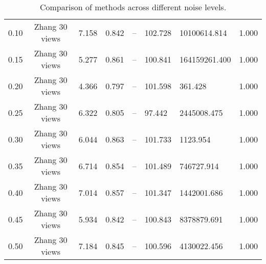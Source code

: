 \begin{table}[H]
\begin{tabular}{l c l l l}
0.10 & Zhang 30 views & 7.158 & 0.842 & -- & 102.728 & 10100614.814 & 1.000 \\
0.15 & Zhang 30 views & 5.277 & 0.861 & -- & 100.841 & 164159261.400 & 1.000 \\
0.20 & Zhang 30 views & 4.366 & 0.797 & -- & 101.598 & 361.428 & 1.000 \\
0.25 & Zhang 30 views & 6.322 & 0.805 & -- & 97.442 & 2445008.475 & 1.000 \\
0.30 & Zhang 30 views & 6.044 & 0.863 & -- & 101.733 & 1123.954 & 1.000 \\
0.35 & Zhang 30 views & 6.714 & 0.854 & -- & 101.489 & 746727.914 & 1.000 \\
0.40 & Zhang 30 views & 7.014 & 0.857 & -- & 101.347 & 1442001.686 & 1.000 \\
0.45 & Zhang 30 views & 5.934 & 0.842 & -- & 100.843 & 8378879.691 & 1.000 \\
0.50 & Zhang 30 views & 7.184 & 0.845 & -- & 100.596 & 4130022.456 & 1.000 \\
\midrule
\bottomrule
\end{tabular}
\label{tab:SyntheticNoise}
\caption{Comparison of methods across different noise levels.}
\end{table}
